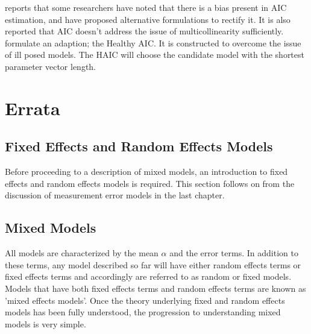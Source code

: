 \documentclass[12pt, a4paper]{report}
\theoremstyle{plain}
\theoremstyle{definition}
\theoremstyle{remark}
\begin{document}
\citet[p.13]{Demi} reports that some researchers have noted that
there is a bias present in AIC estimation, and have proposed
alternative formulations to rectify it. It is also reported that
AIC doesn't address the issue of multicollinearity sufficiently.
\citet{Demi} formulate an adaption; the Healthy AIC. It is
constructed to overcome the issue of ill posed models. The HAIC
will choose the candidate model with the shortest parameter vector
length.


\chapter{Errata}











\section{Fixed Effects and Random Effects Models}
Before proceeding to a description of mixed models, an
introduction to fixed effects and random effects models is
required. This section follows on from the discussion of
measurement error models in the last chapter.




\section{Mixed Models}


All models are characterized by the mean $\alpha$ and the error
terms. In addition to these terms, any model described so far will
have either random effects terms or fixed effects terms and
accordingly are referred to as random or fixed models. Models that
have both fixed effects terms and random effects terms are known
as 'mixed effects models'. Once the theory underlying fixed and
random effects models has been fully understood, the progression
to understanding mixed models is very simple.
\end{document}
